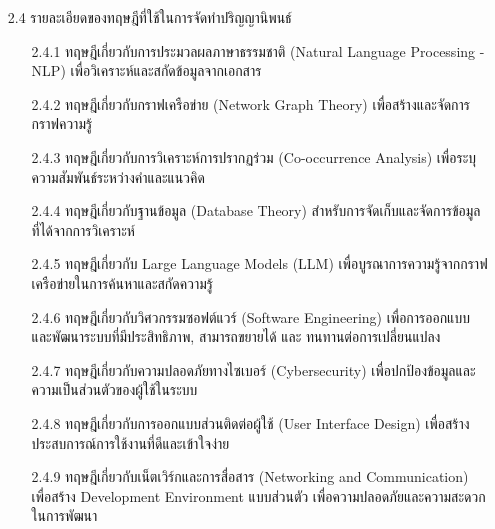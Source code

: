 \documentclass[12pt,a4paper]{article}
\newcommand{\textlight}[1]{{\thailightfont #1}}
\begin{document}
\begin{enumerate}[leftmargin=2cm]
    \item[2.4] รายละเอียดของทฤษฎีที่ใช้ในการจัดทำปริญญานิพนธ์
    \vspace{0.05cm}
    \textlight{
        \begin{enumerate}
            \item[2.4.1] ทฤษฎีเกี่ยวกับการประมวลผลภาษาธรรมชาติ (Natural Language Processing - NLP) เพื่อวิเคราะห์และสกัดข้อมูลจากเอกสาร
            \item[2.4.2] ทฤษฎีเกี่ยวกับกราฟเครือข่าย (Network Graph Theory) เพื่อสร้างและจัดการกราฟความรู้
            \item[2.4.3] ทฤษฎีเกี่ยวกับการวิเคราะห์การปรากฏร่วม (Co-occurrence Analysis) เพื่อระบุความสัมพันธ์ระหว่างคำและแนวคิด
            \item[2.4.4] ทฤษฎีเกี่ยวกับฐานข้อมูล (Database Theory) สำหรับการจัดเก็บและจัดการข้อมูลที่ได้จากการวิเคราะห์
            \item[2.4.5] ทฤษฎีเกี่ยวกับ Large Language Models (LLM) เพื่อบูรณาการความรู้จากกราฟเครือข่ายในการค้นหาและสกัดความรู้
            \item[2.4.6] ทฤษฎีเกี่ยวกับวิศวกรรมซอฟต์แวร์ (Software Engineering) เพื่อการออกแบบและพัฒนาระบบที่มีประสิทธิภาพ, สามารถขยายได้ และ ทนทานต่อการเปลี่ยนแปลง
            \item[2.4.7] ทฤษฎีเกี่ยวกับความปลอดภัยทางไซเบอร์ (Cybersecurity) เพื่อปกป้องข้อมูลและความเป็นส่วนตัวของผู้ใช้ในระบบ
            \item[2.4.8] ทฤษฎีเกี่ยวกับการออกแบบส่วนติดต่อผู้ใช้ (User Interface Design) เพื่อสร้างประสบการณ์การใช้งานที่ดีและเข้าใจง่าย
            \item[2.4.9] ทฤษฎีเกี่ยวกับเน็ตเวิร์กและการสื่อสาร (Networking and Communication) เพื่อสร้าง Development Environment แบบส่วนตัว เพื่อความปลอดภัยและความสะดวกในการพัฒนา
        \end{enumerate}
    }

\end{enumerate}

    
\end{document}
